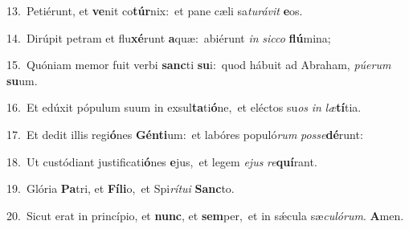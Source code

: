 {\numbfont\textcolor{\numbcolor}{13.}}~Petiérunt, et \textbf{ve}\-nit co\-\textbf{túr}\-nix:~\star et pane cæli sa\-\textit{tu}\-\textit{rá}\textit{vit} \textbf{e}\-os.\par
{\numbfont\textcolor{\numbcolor}{14.}}~Dirúpit petram et flu\-\textbf{xé}\-runt \textbf{a}\-quæ:~\star abiérunt \textit{in} \textit{sic}\-\textit{co} \textbf{flú}\-mina;\par
{\numbfont\textcolor{\numbcolor}{15.}}~Quóniam memor fuit verbi \textbf{sanc}\-ti \textbf{su}\-i:~\star quod hábuit ad Abraham, \textit{pú}\-\textit{e}\textit{rum} \textbf{su}\-um.\par
{\numbfont\textcolor{\numbcolor}{16.}}~Et edúxit pópulum suum in exsul\-\textbf{ta}\-ti\-\textbf{ó}\-ne,~\star et eléctos su\textit{os} \textit{in} \textit{læ}\-\textbf{tí}tia.\par
{\numbfont\textcolor{\numbcolor}{17.}}~Et dedit illis regi\-\textbf{ó}\-nes \textbf{Gén}\-\textbf{ti}um:~\star et labóres populó\textit{rum} \textit{pos}\-\textit{se}\textbf{dé}runt:\par
{\numbfont\textcolor{\numbcolor}{18.}}~Ut custódiant justificati\-\textbf{ó}\-nes \textbf{e}\-jus,~\star et legem \textit{e}\-\textit{jus} \textit{re}\-\textbf{quí}rant.\par
{\numbfont\textcolor{\numbcolor}{19.}}~Glória \textbf{Pa}\-tri, et \textbf{Fí}\-\textbf{li}o,~\star et Spi\-\textit{rí}\-\textit{tu}\textit{i} \textbf{Sanc}\-to.\par
{\numbfont\textcolor{\numbcolor}{20.}}~Sicut erat in princípio, et \textbf{nunc}\-, et \textbf{sem}\-per,~\star et in sǽcula sæ\-\textit{cu}\-\textit{ló}\textit{rum}. \textbf{A}\-men.\par
